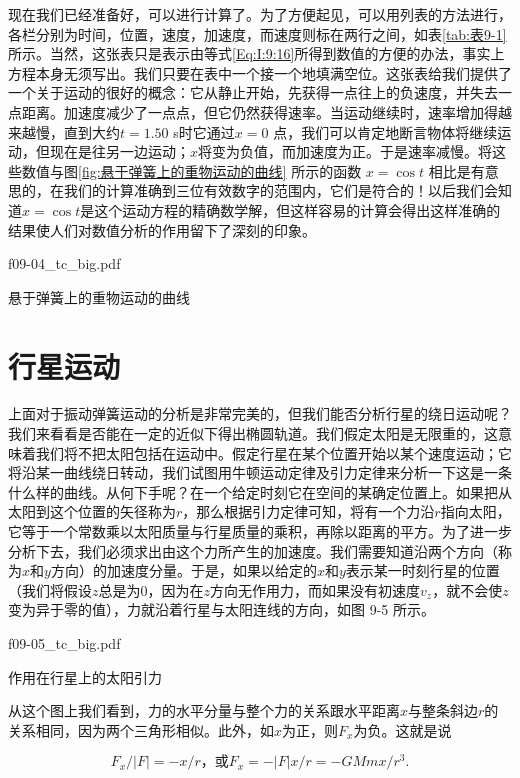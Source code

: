 \documentclass[12pt,oneside]{book}
\providecommand{\abs}[1]{\lvert#1\rvert}
\begin{document}
现在我们已经准备好，可以进行计算了。为了方便起见，可以用列表的方法进行，各栏分别为时间，位置，速度，加速度，而速度则标在两行之间，如表\ref{tab:表9-1}所示。当然，这张表只是表示由等式\eqref{Eq:I:9:16}所得到数值的方便的办法，事实上方程本身无须写出。我们只要在表中一个接一个地填满空位。这张表给我们提供了一个关于运动的很好的概念：它从静止开始，先获得一点往上的负速度，并失去一点距离。加速度减少了一点点，但它仍然获得速率。当运动继续时，速率增加得越来越慢，直到大约$ t=1.50 $ s时它通过$ x=0 $ 点，我们可以肯定地断言物体将继续运动，但现在是往另一边运动；$ x $将变为负值，而加速度为正。于是速率减慢。将这些数值与图\ref{fig:悬于弹簧上的重物运动的曲线} 所示的函数 $ x=\cos t $ 相比是有意思的，在我们的计算准确到三位有效数字的范围内，它们是符合的！以后我们会知道$ x=\cos t $是这个运动方程的精确数学解，但这样容易的计算会得出这样准确的结果使人们对数值分析的作用留下了深刻的印象。

\begin{fig}{f09-04_tc_big.pdf}
\caption{悬于弹簧上的重物运动的曲线}
\label{fig:悬于弹簧上的重物运动的曲线}
\end{fig}


\section{行星运动}
上面对于振动弹簧运动的分析是非常完美的，但我们能否分析行星的绕日运动呢？我们来看看是否能在一定的近似下得出椭圆轨道。我们假定太阳是无限重的，这意味着我们将不把太阳包括在运动中。假定行星在某个位置开始以某个速度运动；它将沿某一曲线绕日转动，我们试图用牛顿运动定律及引力定律来分析一下这是一条什么样的曲线。从何下手呢？在一个给定时刻它在空间的某确定位置上。如果把从太阳到这个位置的矢径称为$r$，那么根据引力定律可知，将有一个力沿$r$指向太阳，它等于一个常数乘以太阳质量与行星质量的乘积，再除以距离的平方。为了进一步分析下去，我们必须求出由这个力所产生的加速度。我们需要知道沿两个方向（称为$x$和$y$方向）的加速度分量。于是，如果以给定的$x$和$y$表示某一时刻行星的位置（我们将假设$z$总是为$0$，因为在$z$方向无作用力，而如果没有初速度$v_{z}$，就不会使$z$变为异于零的值），力就沿着行星与太阳连线的方向，如图 9-5 所示。

\begin{fig}{f09-05_tc_big.pdf}
\caption{作用在行星上的太阳引力}
\label{fig:作用在行星上的太阳引力}
\end{fig}


从这个图上我们看到，力的水平分量与整个力的关系跟水平距离$x$与整条斜边$r$的关系相同，因为两个三角形相似。此外，如$x$为正，则$F_{x}$为负。这就是说

\[
F_x/\abs{F}=-x/r \text{，或} F_x= -\abs{F}x/r=-GMmx/r^3 \text{.}
\]
\end{document}
